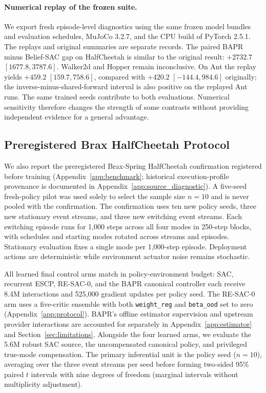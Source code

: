 \documentclass[twoside,11pt]{article}
\newcommand{\resacbaseline}{RE-SAC-0}
\begin{document}
\FloatBarrier

\paragraph{Numerical replay of the frozen suite.}
We export fresh episode-level diagnostics using the same frozen model bundles and evaluation schedules, MuJoCo 3.2.7, and the CPU build of PyTorch 2.5.1. The replays and original summaries are separate records. The paired BAPR minus Belief-SAC gap on HalfCheetah is similar to the original result: \(+2732.7\) \([1677.8,3787.6]\). Walker2d and Hopper remain inconclusive. On Ant the replay yields \(+459.2\) \([159.7,758.6]\), compared with \(+420.2\) \([-144.4,984.6]\) originally; the inverse-minus-shared-forward interval is also positive on the replayed Ant runs. The same trained seeds contribute to both evaluations. Numerical sensitivity therefore changes the strength of some contrasts without providing independent evidence for a general advantage.



\FloatBarrier
\subsection{Preregistered Brax HalfCheetah Protocol}

We also report the preregistered Brax-Spring HalfCheetah confirmation registered before training (Appendix~\ref{app:benchmark}; historical execution-profile provenance is documented in Appendix~\ref{app:source_diagnostic}). A five-seed fresh-policy pilot was used solely to select the sample size $n=10$ and is never pooled with the confirmation. The confirmation uses ten new policy seeds, three new stationary event streams, and three new switching event streams. Each switching episode runs for 1,000 steps across all four modes in 250-step blocks, with schedules and starting modes rotated across streams and episodes. Stationary evaluation fixes a single mode per 1,000-step episode. Deployment actions are deterministic while environment actuator noise remains stochastic.

All learned final control arms match in policy-environment budget: SAC, recurrent ESCP, \resacbaseline{}, and the BAPR canonical controller each receive 8.4M interactions and 525,000 gradient updates per policy seed. The \resacbaseline{} arm uses a five-critic ensemble with both \texttt{weight\_reg} and \texttt{beta\_ood} set to zero (Appendix~\ref{app:protocol}). BAPR's offline estimator supervision and upstream provider interactions are accounted for separately in Appendix~\ref{app:estimator} and Section~\ref{sec:limitations}. Alongside the four learned arms, we evaluate the 5.6M robust SAC source, the uncompensated canonical policy, and privileged true-mode compensation. The primary inferential unit is the policy seed ($n=10$), averaging over the three event streams per seed before forming two-sided 95\% paired $t$ intervals with nine degrees of freedom (marginal intervals without multiplicity adjustment).
\end{document}
